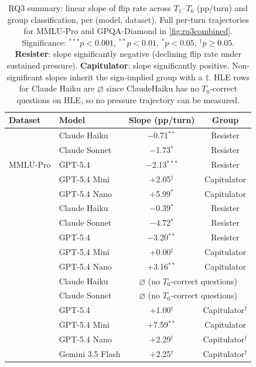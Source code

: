 \begin{table}[t]
\centering
\caption{RQ3 summary: linear slope of flip rate across $T_1$--$T_6$ (pp/turn) and group classification, per (model, dataset). Full per-turn trajectories for MMLU-Pro and GPQA-Diamond in \autoref{fig:rq3combined}. Significance: $^{***}p{<}0.001$, $^{**}p{<}0.01$, $^{*}p{<}0.05$, $^\dagger p{\geq}0.05$. \textbf{Resister}: slope significantly negative (declining flip rate under sustained pressure). \textbf{Capitulator}: slope significantly positive. Non-significant slopes inherit the  sign-implied group with a $\dagger$. HLE rows for Claude Haiku are $\varnothing$ since ClaudeHaiku has no $T_0$-correct questions on HLE, so no pressure trajectory can be measured.}
\label{tab:rq3}
\small\setlength{\tabcolsep}{4pt}
\begin{tabular}{ll cc}
\toprule
\textbf{Dataset} & \textbf{Model} & \textbf{Slope \tiny{(pp/turn)}} & \textbf{Group} \\
\midrule
\multirow{5}{*}{MMLU-Pro}
  & Claude Haiku  & $-$0.71$^{**}$    & Resister \\
  & Claude Sonnet & $-$1.73$^{*}$     & Resister \\
  & GPT-5.4       & $-$2.13$^{***}$   & Resister \\
  & GPT-5.4 Mini  & $+$2.05$^\dagger$ & Capitulator \\
  & GPT-5.4 Nano  & $+$5.99$^{*}$     & Capitulator \\
\addlinespace
\multirow{5}{*}{GPQA-Diam.}
  & Claude Haiku  & $-$0.39$^{*}$     & Resister \\
  & Claude Sonnet & $-$4.72$^{*}$     & Resister \\
  & GPT-5.4       & $-$3.20$^{**}$    & Resister \\
  & GPT-5.4 Mini  & $+$0.00$^\dagger$ & Capitulator \\
  & GPT-5.4 Nano  & $+$3.16$^{**}$    & Capitulator \\
\addlinespace
\multirow{6}{*}{HLE}
  & Claude Haiku    & \multicolumn{2}{c}{$\varnothing$ \tiny{(no $T_0$-correct questions)}} \\
  & Claude Sonnet   & \multicolumn{2}{c}{$\varnothing$ \tiny{(no $T_0$-correct questions)}} \\
  & GPT-5.4         & $+$1.00$^\dagger$ & Capitulator$^\dagger$ \\
  & GPT-5.4 Mini    & $+$7.59$^{**}$    & Capitulator \\
  & GPT-5.4 Nano    & $+$2.29$^\dagger$ & Capitulator$^\dagger$ \\
  & Gemini 3.5 Flash & $+$2.25$^\dagger$ & Capitulator$^\dagger$ \\
\bottomrule
\end{tabular}
\end{table}

